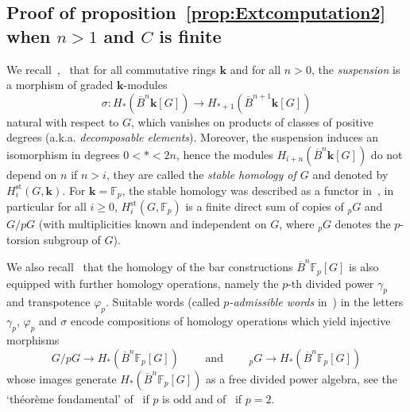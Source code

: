 \documentclass{amsart}
\theoremstyle{definition}
\theoremstyle{remark}
\newcommand{\F}{\mathbb F}
\renewcommand{\ge}{\geqslant}
\renewcommand{\phi}{\varphi}
\def\k{\mathbf{k}}
\begin{document}
\subsection{Proof of proposition~\ref{prop:Extcomputation2} when $n>1$ and $C$ is finite}\label{subsec:proofn} 
We recall~\cite[Section~14]{ei-ml-53},~\cite[Exp.~6]{ca-54} that for all commutative rings $\k$ and for all $n>0$, the \emph{suspension} is a morphism of graded $\k$-modules 
\[
	\sigma\colon H_*(\overline{B}^n\k[G])\to H_{*+1}(\overline{B}^{n+1}\k[G])
\]
natural with respect to $G$, which vanishes on products of classes of positive degrees (a.k.a. \emph{decomposable elements}). Moreover, the suspension induces an isomorphism in degrees $0< *< 2n$, hence the modules $H_{i+n}(\overline{B}^n\k[G])$ do not depend on $n$ if $n>i$, they are called the \emph{stable homology of $G$} and denoted by $H_i^{\mathrm{st}}(G,\k)$. 
For $\k=\F_p$, the stable homology was described as a functor in~\cite[Exp.~10,~\S6]{ca-54}, in particular for all $i\ge 0$,  $H_i^{\mathrm{st}}(G,\F_p)$ is a finite direct sum of copies of $_pG$ and $G/pG$ (with multiplicities known and independent on $G$, where $_pG$ denotes the $p$-torsion subgroup of $G$).

We also recall~\cite[Exp.~6]{ca-54} that the homology of the bar constructions $\overline{B}^n\F_p[G]$ is also equipped with further homology operations, namely the $p$-th divided power $\gamma_p$ and transpotence $\phi_p$. Suitable words (called  \emph{$p$-admissible words} in~\cite{ca-54}) in the letters $\gamma_p$, $\phi_p$ and $\sigma$ encode compositions of homology operations which yield injective morphisms 
\[
	G/pG\to H_*(\overline{B}^n\F_p[G]) \qquad\text{ and }\qquad  {}_pG\to H_*(\overline{B}^n\F_p[G])
\]
whose images generate $H_*(\overline{B}^n\F_p[G])$ as a free divided power algebra, see the `théorème fondamental' of~\cite[Exp.~9,~\S3]{ca-54} if $p$ is odd and of~\cite[Exp.~10,~\S2]{ca-54} if $p=2$.
\end{document}
